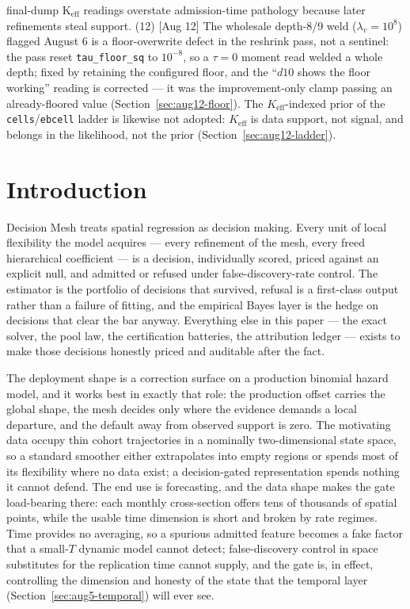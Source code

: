 \documentclass[11pt]{article}
\begin{document}
final-dump K$_{\mathrm{eff}}$ readings overstate admission-time pathology because
later refinements steal support. (12) [Aug 12] The wholesale depth-8/9 weld
($\lambda_v=10^8$) flagged August 6 is a floor-overwrite defect in the reshrink
pass, not a sentinel: the pass reset \texttt{tau\_floor\_sq} to $10^{-8}$, so a
$\tau=0$ moment read welded a whole depth; fixed by retaining the configured
floor, and the ``$d10$ shows the floor working'' reading is corrected --- it
was the improvement-only clamp passing an already-floored value
(Section~\ref{sec:aug12-floor}). The $K_{\mathrm{eff}}$-indexed prior of the
\texttt{cells}/\texttt{ebcell} ladder is likewise not adopted:
$K_{\mathrm{eff}}$ is data support, not signal, and belongs in the likelihood,
not the prior (Section~\ref{sec:aug12-ladder}).

\section{Introduction}\label{sec:intro}

Decision Mesh treats spatial regression as decision making. Every unit of local flexibility the
model acquires --- every refinement of the mesh, every freed hierarchical coefficient --- is a
decision, individually scored, priced against an explicit null, and admitted or refused under
false-discovery-rate control. The estimator is the portfolio of decisions that survived, refusal is
a first-class output rather than a failure of fitting, and the empirical Bayes layer is the hedge on
decisions that clear the bar anyway. Everything else in this paper --- the exact solver, the pool
law, the certification batteries, the attribution ledger --- exists to make those decisions honestly
priced and auditable after the fact.

The deployment shape is a correction surface on a production binomial hazard model, and it works
best in exactly that role: the production offset carries the global shape, the mesh decides only
where the evidence demands a local departure, and the default away from observed support is zero.
The motivating data occupy thin cohort trajectories in a nominally two-dimensional state space, so a
standard smoother either extrapolates into empty regions or spends most of its flexibility where no
data exist; a decision-gated representation spends nothing it cannot defend. The end use is
forecasting, and the data shape makes the gate load-bearing there: each monthly cross-section offers
tens of thousands of spatial points, while the usable time dimension is short and broken by rate
regimes. Time provides no averaging, so a spurious admitted feature becomes a fake factor that a
small-$T$ dynamic model cannot detect; false-discovery control in space substitutes for the
replication time cannot supply, and the gate is, in effect, controlling the dimension and honesty of
the state that the temporal layer (Section~\ref{sec:aug5-temporal}) will ever see.
\end{document}
